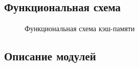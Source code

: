\documentclass[13pt]{article}
\begin{document}
	\subsection{Функциональная схема}
	\begin{figure}[h!]
		\caption{Функциональная схема кэш-памяти}
	\end{figure}
	\newpage
	\subsection{Описание модулей}
\end{document}
